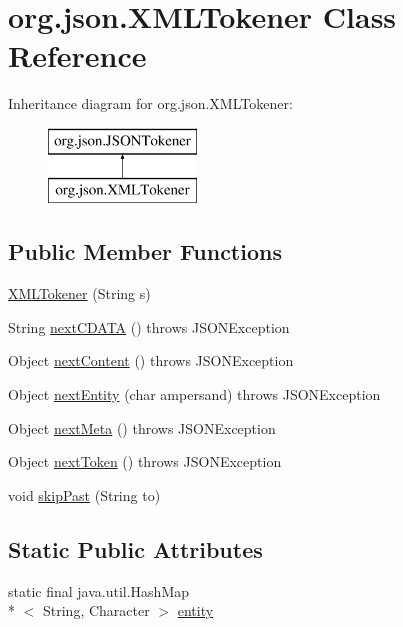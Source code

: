 \hypertarget{classorg_1_1json_1_1XMLTokener}{\section{org.\-json.\-X\-M\-L\-Tokener Class Reference}
\label{classorg_1_1json_1_1XMLTokener}
}
Inheritance diagram for org.\-json.\-X\-M\-L\-Tokener\-:\begin{figure}[H]
\begin{center}
\leavevmode
\includegraphics[height=2.000000cm]{classorg_1_1json_1_1XMLTokener}
\end{center}
\end{figure}
\subsection*{Public Member Functions}
\begin{DoxyCompactItemize}
\item 
\hyperlink{classorg_1_1json_1_1XMLTokener_a43ba71b6376938f07b4781fb6c66a7ac}{X\-M\-L\-Tokener} (String s)
\item 
String \hyperlink{classorg_1_1json_1_1XMLTokener_a0f321a2fa10eb19c08d05cf17cfa4e54}{next\-C\-D\-A\-T\-A} ()  throws J\-S\-O\-N\-Exception 
\item 
Object \hyperlink{classorg_1_1json_1_1XMLTokener_a356e0c4bb50197720b5eb638783b632c}{next\-Content} ()  throws J\-S\-O\-N\-Exception 
\item 
Object \hyperlink{classorg_1_1json_1_1XMLTokener_aa67ac8eb561a438290fad648fd295fd5}{next\-Entity} (char ampersand)  throws J\-S\-O\-N\-Exception 
\item 
Object \hyperlink{classorg_1_1json_1_1XMLTokener_aa36d5f6baf25f85fef0468fadcc3b8ff}{next\-Meta} ()  throws J\-S\-O\-N\-Exception 
\item 
Object \hyperlink{classorg_1_1json_1_1XMLTokener_a654e38e5abe2ad37e10f968613dab875}{next\-Token} ()  throws J\-S\-O\-N\-Exception 
\item 
void \hyperlink{classorg_1_1json_1_1XMLTokener_ae07153a6cfc7008a20c9d641652d6dea}{skip\-Past} (String to)
\end{DoxyCompactItemize}
\subsection*{Static Public Attributes}
\begin{DoxyCompactItemize}
\item 
static final java.\-util.\-Hash\-Map\\*
$<$ String, Character $>$ \hyperlink{classorg_1_1json_1_1XMLTokener_a5a02386c42df34f43f756dd46c03a6ea}{entity}
\end{DoxyCompactItemize}
